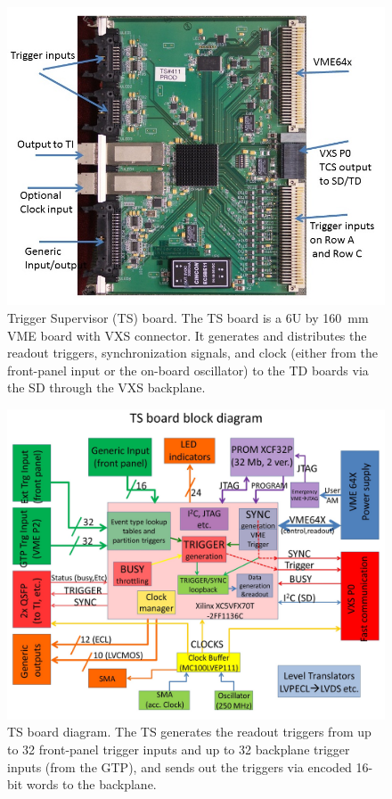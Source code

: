 \begin{figure}[hbt]
	\centering
	\includegraphics[width=1.0\columnwidth,keepaspectratio]{img/TSused.jpg}
	\caption{Trigger Supervisor (TS) board.  The TS board is a 6U by 160~mm VME board with VXS connector.  It
          generates and distributes the readout triggers, synchronization signals, and clock (either from the front-panel
          input or the on-board oscillator) to the TD boards via the SD through the VXS backplane.}
	\label{fig:TSused}
\end{figure}

\begin{figure}[hbt]
	\centering
	\includegraphics[width=1.0\columnwidth,keepaspectratio]{img/TSdiagram.jpg}
	\caption{TS board diagram.  The TS generates the readout triggers from up to 32 front-panel trigger inputs and up
          to 32 backplane trigger inputs (from the GTP), and sends out the triggers via encoded 16-bit words to the backplane.}
	\label{fig:TSdiagram}
\end{figure}

